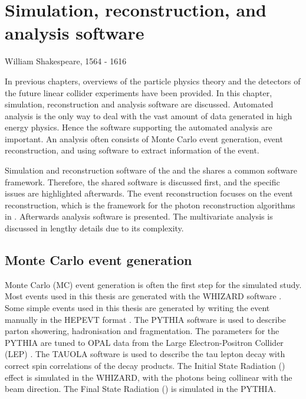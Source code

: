 \chapter{Simulation, reconstruction, and analysis software}
\label{chap:Reconstruction}

%
{William Shakespeare, 1564 - 1616}%


In previous chapters, overviews of the particle physics theory and the detectors of the future linear collider experiments have been provided. In this chapter, simulation, reconstruction and analysis software are discussed. Automated analysis is the only way to deal with the vast amount of data generated in high energy physics. Hence the software supporting the automated analysis are important. An analysis often consists of  Monte Carlo event generation, event reconstruction, and using software to extract information of the event.

Simulation and reconstruction software of the  \ILC and the \CLIC shares a  common software framework.  Therefore,  the shared  software is discussed first, and the \CLIC specific issues are highlighted afterwards. The event reconstruction focuses on the \pandora event reconstruction, which is the framework for the photon reconstruction algorithms in . Afterwards analysis software is presented.   The multivariate analysis  is discussed  in lengthy details due to its complexity.

\section{Monte Carlo event generation}
\label{sec:pandoraMC}
Monte Carlo (MC) event generation is often the first step for the simulated study. Most events used in this thesis are generated with the WHIZARD software \cite{whizard,Moretti:2001zz}. Some simple events used in this thesis are generated by writing the event manually in the  HEPEVT format \cite{Altarelli:1989hx}. The PYTHIA software \cite{Sjostrand:1995iq} is used to describe parton showering, hadronisation and fragmentation. The parameters for the PYTHIA are tuned to OPAL data from the Large Electron-Positron Collider (LEP) \cite{Alexander:1995bk}. The TAUOLA software \cite{Jadach:1993hs} is used to describe the tau lepton decay with correct spin correlations of the decay products. The Initial State Radiation (\ISR) effect is simulated in the WHIZARD, with the \ISR photons being collinear with the beam direction. The Final State Radiation (\FSR) is simulated in the PYTHIA.


